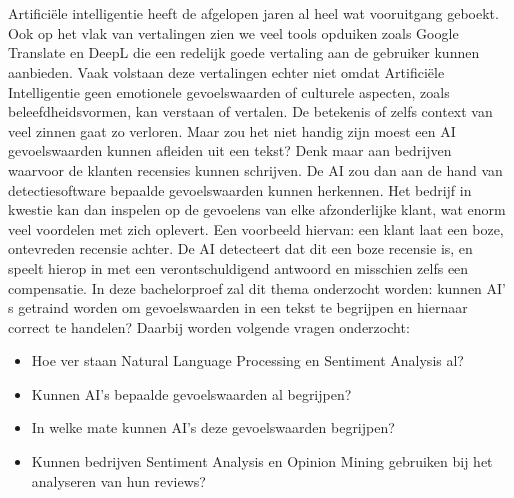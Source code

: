 
\chapter{}
\label{ch:inleiding}

Artificiële intelligentie heeft de afgelopen jaren al heel wat vooruitgang geboekt. Ook op het vlak van vertalingen zien we veel tools opduiken zoals Google Translate en DeepL die een redelijk goede vertaling aan de gebruiker kunnen aanbieden. Vaak volstaan deze vertalingen echter niet omdat Artificiële Intelligentie geen emotionele gevoelswaarden of culturele aspecten, zoals beleefdheidsvormen, kan verstaan of vertalen. De betekenis of zelfs context van veel zinnen gaat zo verloren. Maar zou het niet handig zijn moest een AI gevoelswaarden kunnen afleiden uit een tekst? Denk maar aan bedrijven waarvoor de klanten recensies kunnen schrijven. De AI zou dan aan de hand van detectiesoftware bepaalde gevoelswaarden kunnen herkennen. Het bedrijf in kwestie kan dan inspelen op de gevoelens van elke afzonderlijke klant, wat enorm veel voordelen met zich oplevert.
Een voorbeeld hiervan: een klant laat een boze, ontevreden recensie achter. De AI detecteert dat dit een boze recensie is, en speelt hierop in met een verontschuldigend antwoord en misschien zelfs een compensatie.  
In deze bachelorproef zal dit thema onderzocht worden: kunnen AI' s getraind worden om gevoelswaarden in een tekst te begrijpen en hiernaar correct te handelen? Daarbij worden volgende vragen onderzocht:

\begin{itemize}
    \item Hoe ver staan Natural Language Processing en Sentiment Analysis al?
    \item Kunnen AI's bepaalde gevoelswaarden al begrijpen?
    \item In welke mate kunnen AI's deze gevoelswaarden begrijpen?
    \item Kunnen bedrijven Sentiment Analysis en Opinion Mining gebruiken bij het analyseren van hun reviews?
\end{itemize}


\section{}
\label{sec:probleemstelling}

